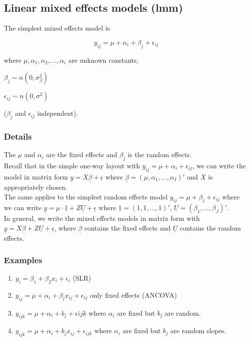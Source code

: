 \documentclass[12pt,a4paper]{article}
\theoremstyle{regla}
\theoremstyle{remark}
\theoremstyle{definition}
\theoremstyle{nonumberbreak}
\begin{document}
\subsection{Linear mixed effects models (lmm)}
\begin{fbox}
\begin{minipage}{0.97\textwidth}
The simplest mixed effects model is

$$y_{ij} = \mu + \alpha_i + \beta_j + \epsilon_{ij}$$

where $\mu, \alpha_1, \alpha_2, \ldots, \alpha_i$ are unknown constants, 

$\beta_j \sim n(0,\sigma^2_\beta)$

$\epsilon_{ij} \sim n(0,\sigma^2)$

($\beta_j$ and $\epsilon_{ij}$ independent).
\end{minipage}
\end{fbox}
\subsubsection{Details}
The $\mu$ and $\alpha_i$ are the fixed effects and $\beta_j$ is the random effects.\\

Recall that in the simple one-way layout with $y_{ij} = \mu + \alpha_i + \epsilon_{ij}$, we can write the model in matrix form
$\underline{y} = X \underline{\beta} + \underline{\epsilon}$ where $\underline{\beta} = (\mu, \alpha_1, \ldots, \alpha_I)'$ and $X$ is appropriately chosen. \\

The same applies to the simplest random effects model $y_{ij}= \mu + \beta_j+ \epsilon_{ij}$ where we can write $\underline{y} = \mu \cdot \underline{1}+ Z \underline{U} + \underline{\epsilon}$ where $\underline{1}=(1,1, \ldots , 1)'$, $\underline{U} = ( \beta_1 , \ldots , \beta_J )'$.\\

In general, we write the mixed effects models in matrix form with $\underline{y} = X \underline{\beta} + Z \underline{U} + \underline {\epsilon}$, where $\underline{\beta}$ contains the fixed effects and $\underline{U}$ contains the random effects.
\subsubsection{Examples}
\begin{xmpl}
\begin{enumerate}
\item $y_i = \beta_1 + \beta_2 x_i + \epsilon_i$ (SLR)
\item $y_{ij} = \mu + \alpha_i + \beta_i x_{ij} + \epsilon_{ij}$ only fixed effects (ANCOVA)
\item $y_{ijk} = \mu + \alpha_i + b_j + \epsilon{ijk}$ where $\alpha_i$ are fixed but $b_j$ are random.
\item $y_{ijk} = \mu  + \alpha_i + b_j x_{ij} + \epsilon_{ijk}$ where $\alpha_i$ are fixed but $b_j$ are random slopes.
\end{enumerate}
\end{xmpl}
\end{document}
